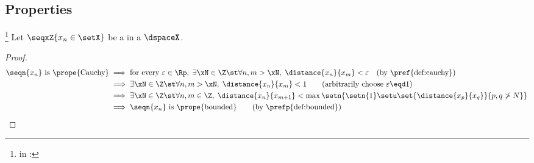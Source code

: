 \subsection{Properties}
\begin{proposition}
\footnote{
  in :
  }
\label{prop:cauchy==>bounded}
Let $\seqxZ{x_n\in\setX}$ be a  in a  $\dspaceX$. %
\end{proposition}
\begin{proof}
\begin{align*}
  \text{$\seqn{x_n}$ is \prope{Cauchy}}
    &\implies \text{for every $\varepsilon\in\Rp$},\; \exists\xN\in\Z \st \forall n,m>\xN,\; \distance{x_n}{x_m}<\varepsilon
    \quad \text{(by \pref{def:cauchy})}
  \\&\implies \exists\xN\in\Z \st \forall n,m>\xN,\; \distance{x_n}{x_m}<1
    \qquad \text{(arbitrarily choose $\varepsilon\eqd1$)}
  \\&\implies \exists\xN\in\Z \st \forall n,m\in\Z,\; \distance{x_n}{x_{m+1}}<\max\setn{\setn{1}\setu\set{\distance{x_p}{x_q}}{p,q\ngtr N}}
  \\&\implies \text{$\seqn{x_n}$ is \prope{bounded}}
    \qquad \text{(by \prefp{def:bounded})}
\end{align*}
\end{proof}


